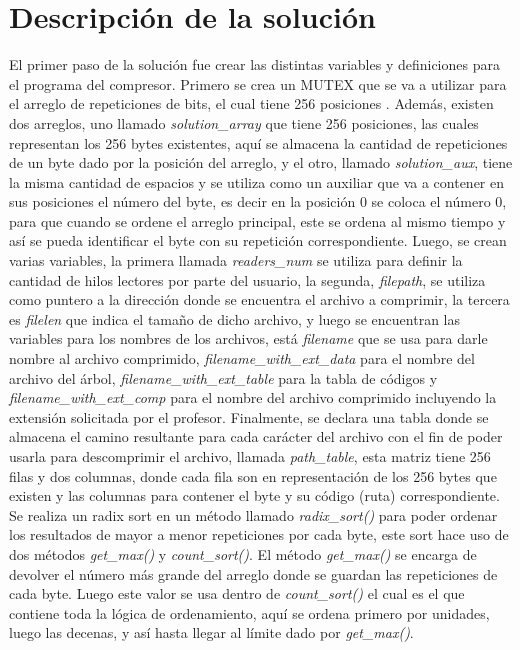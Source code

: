 \documentclass[12pt, article, natbib]{IEEEtran}
\begin{document}
\section{Descripción de la solución}
El primer paso de la solución fue crear las distintas variables y definiciones para el programa del compresor. Primero se crea un MUTEX que se va a utilizar para el arreglo de repeticiones de bits, el cual tiene 256 posiciones\cite{cppdev_2010_c} \cite{manrow_2011_c}. Además, existen dos arreglos, uno llamado \textit{solution\_array} que tiene 256 posiciones, las cuales representan los 256 bytes existentes, aquí se almacena la cantidad de repeticiones de un byte dado por la posición del arreglo, y el otro, llamado \textit{solution\_aux}, tiene la misma cantidad de espacios y se utiliza como un auxiliar que va a contener en sus posiciones el número del byte, es decir en la posición 0 se coloca el número 0, para que cuando se ordene el arreglo principal, este se ordena al mismo tiempo y así se pueda identificar el byte con su repetición correspondiente. Luego, se crean varias variables, la primera llamada \textit{readers\_num} se utiliza para definir la cantidad de hilos lectores por parte del usuario, la segunda, \textit{filepath}, se utiliza como puntero a la dirección donde se encuentra el archivo a comprimir, la tercera es \textit{filelen} que indica el tamaño de dicho archivo, y luego se encuentran las variables para los nombres de los archivos, está \textit{filename} que se usa para darle nombre al archivo comprimido, \textit{filename\_with\_ext\_data} para el nombre del archivo del árbol, \textit{filename\_with\_ext\_table} para la tabla de códigos y \textit{filename\_with\_ext\_comp} para el nombre del archivo comprimido incluyendo la extensión solicitada por el profesor. Finalmente, se declara una tabla donde se almacena el camino resultante para cada carácter del archivo con el fin de poder usarla para descomprimir el archivo, llamada \textit{path\_table}, esta matriz tiene 256 filas y dos columnas, donde cada fila son en representación de los 256 bytes que existen y las columnas para contener el byte y su código (ruta) correspondiente.\\

Se realiza un radix sort\cite{geeksforgeeks_2013_radix} en un método llamado \textit{radix\_sort()} para poder ordenar los resultados de mayor a menor repeticiones por cada byte, este sort hace uso de dos métodos \textit{get\_max()} y \textit{count\_sort()}. El método \textit{get\_max()} se encarga de devolver el número más grande del arreglo donde se guardan las repeticiones de cada byte. Luego este valor se usa dentro de \textit{count\_sort()} el cual es el que contiene toda la lógica de ordenamiento, aquí se ordena primero por unidades, luego las decenas, y así hasta llegar al límite dado por \textit{get\_max()}.\\
\end{document}
